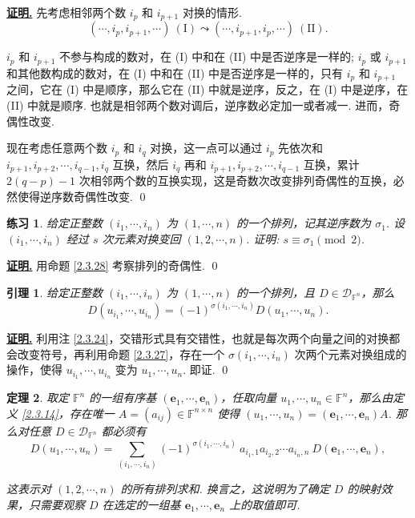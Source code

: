 \documentclass[10pt,openany]{article}
\theoremstyle{thmstyle} %
\newtheorem{theorem}{定理}[subsection]
\newtheorem{practice}{练习}[section]
\theoremstyle{defstyle} %
\newtheorem{lemma}[theorem]{引理}
\theoremstyle{prostyle} %
\theoremstyle{exastyle}
\theoremstyle{remstyle}
\renewenvironment{proof}[1][证明]{\par\underline{\textbf{#1.}} \;\fangsong}{\qed\par}
\newcommand{\F}{\mathbb{F}}
\newcommand{\n}{^{n \times n}}
\newcommand{\bme}{\bm{e}}
\begin{document}
\begin{proof}
	先考虑相邻两个数 \( i_p \) 和 \( i_{p+1} \) 对换的情形. 
	\[ (\cdots,i_p,i_{p+1},\cdots) \ (\text{I}) \leadsto (\cdots,i_{p+1},i_{p},\cdots) \ (\text{II}). \]
	
	 \( i_p \) 和 \( i_{p+1} \) 不参与构成的数对，在 (I) 中和在 (II) 中是否逆序是一样的; \( i_p \) 或 \( i_{p+1} \) 和其他数构成的数对，在 (I) 中和在 (II) 中是否逆序是一样的，只有 \( i_p \) 和 \( i_{p+1} \) 之间，它在 (I) 中是顺序，那么它在 (II) 中就是逆序，反之，在 (I) 中是逆序，在 (II) 中就是顺序. 也就是相邻两个数对调后，逆序数必定加一或者减一. 进而，奇偶性改变. 
	 
	 现在考虑任意两个数 \( i_p \) 和 \( i_q \) 对换，这一点可以通过 \( i_p \) 先依次和 \( i_{p+1}, i_{p+2},\cdots,i_{q-1}, i_q \) 互换，然后 \( i_q \) 再和 \( i_{p+1}, i_{p+2},\cdots,i_{q-1} \) 互换，累计 \( 2(q-p)-1 \) 次相邻两个数的互换实现，这是奇数次改变排列奇偶性的互换，必然使得逆序数奇偶性改变.
\end{proof}

\begin{practice}
	给定正整数 \( (i_1,\cdots,i_n) \) 为 \( (1,\cdots,n) \) 的一个排列，记其逆序数为 \( \sigma_1 \). 设 \( (i_1,\cdots,i_n) \) 经过 \( s \) 次元素对换变回 \( (1,2,\cdots,n) \). 证明: \( s \equiv \sigma_1 \pmod 2 \).
\end{practice}

\begin{proof}
	用命题 \ref{2.3.28} 考察排列的奇偶性.
\end{proof}

\begin{lemma} \label{2.3.29}
	给定正整数 \( (i_1,\cdots,i_n) \) 为 \( (1,\cdots,n) \) 的一个排列，且 \( D \in \mathcal{D}_{\F^n} \)，那么
	\[ D(u_{i_1},\cdots,u_{i_n})=(-1)^{\sigma(i_1,\cdots,i_n)} D(u_1,\cdots,u_n). \]
\end{lemma}

\begin{proof}
	利用注 \ref{2.3.24}，交错形式具有交错性，也就是每次两个向量之间的对换都会改变符号，再利用命题 \ref{2.3.27}，存在一个 \( \sigma(i_1,\cdots,i_n) \) 次两个元素对换组成的操作，使得 \( u_{i_1},\cdots,u_{i_n} \) 变为 \( u_1,\cdots,u_n \). 即证.
\end{proof}

\begin{theorem} \label{2.3.30}
	取定 \( \F^n \) 的一组有序基 \( (\bme_1,\cdots,\bme_n) \)，任取向量 \( u_1,\cdots,u_n \in \F^n \)，那么由定义 \ref{2.3.14}，存在唯一 \( A=(a_{ij}) \in \F\n \) 使得 \( (u_1,\cdots,u_n)=(\bme_1,\cdots,\bme_n)A \). 那么对任意 \( D \in \mathcal{D}_{\F^n} \) 都必须有
	\begin{equation}
		 D(u_1,\cdots,u_n)= \sum_{(i_1,\cdots,i_n)}^{} (-1)^{\sigma(i_1,\cdots,i_n)} \ a_{i_1,1}a_{i_2,2}\cdots a_{i_n,n} \ D(\bme_1,\cdots,\bme_n),
		 \label{equ2.3.1}
	\end{equation}
	
	这表示对 \( (1,2,\cdots,n) \) 的所有排列求和. 换言之，这说明为了确定 \( D \) 的映射效果，只需要观察 \( D \) 在选定的一组基 \( \bme_1,\cdots,\bme_n \) 上的取值即可.
\end{theorem}
\end{document}
